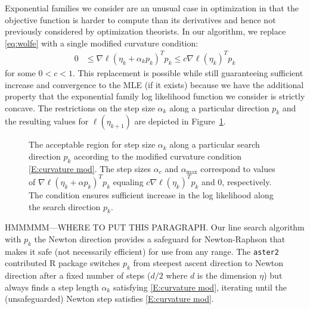 Exponential families we consider are an unusual case in optimization in that the 
objective function 
is harder to compute than its derivatives and hence not previously considered by 
optimization theorists.
In our algorithm, we replace \eqref{eq:wolfe} with a single modified curvature 
condition:
\begin{align} \label{E:curvature mod}
	 0 & \leq \nabla \ell( \eta_k + \alpha_k p_k)^T p_k \leq c \nabla \ell(\eta_k)^T p_k
\end{align}
for some $0 < c < 1$.  This replacement is possible while still guaranteeing 
sufficient increase and convergence to the MLE (if it exists) 
because we have the additional property that the exponential family log likelihood 
function we consider is strictly 
concave.  The restrictions on the step size $\alpha_k$ along a particular direction 
$p_k$ and the resulting values for 
$\ell(\eta_{k+1})$ are depicted in Figure~\ref{F:alpha_region}.  



\begin{figure}[h]
\centering
    \scalebox{.4}{}
	\caption{The acceptable region for step size $\alpha_k$ along a particular search 
direction $p_k$ according to the modified curvature condition \eqref{E:curvature mod}.  
The step sizes $\alpha_{c}$ and $\alpha_{\textrm{max}}$ 
correspond to values of $\nabla \ell( \eta_k + \alpha p_k)^T p_k$ equaling 
$c \nabla \ell(\eta_k)^T p_k$ and $0$, 
respectively.  The condition ensures sufficient increase in the log likelihood along 
the search direction $p_k$.}
\label{F:alpha_region}
\end{figure}
 
 
HMMMMM---WHERE TO PUT THIS PARAGRAPH.  Our line search algorithm with $p_k$ 
the Newton direction provides a
safeguard for Newton-Raphson that makes it safe (not necessarily efficient) for use 
from any range.
The \texttt{aster2} contributed R package \citep{aster:R} switches $p_k$ from steepest 
ascent direction to Newton direction
after a fixed number of steps ($d / 2$ where $d$ is the dimension $\eta$) but always 
finds a step length $\alpha_k$ satisfying
\eqref{E:curvature mod}, iterating until the (unsafeguarded) Newton step satisfies 
\eqref{E:curvature mod}.\\



